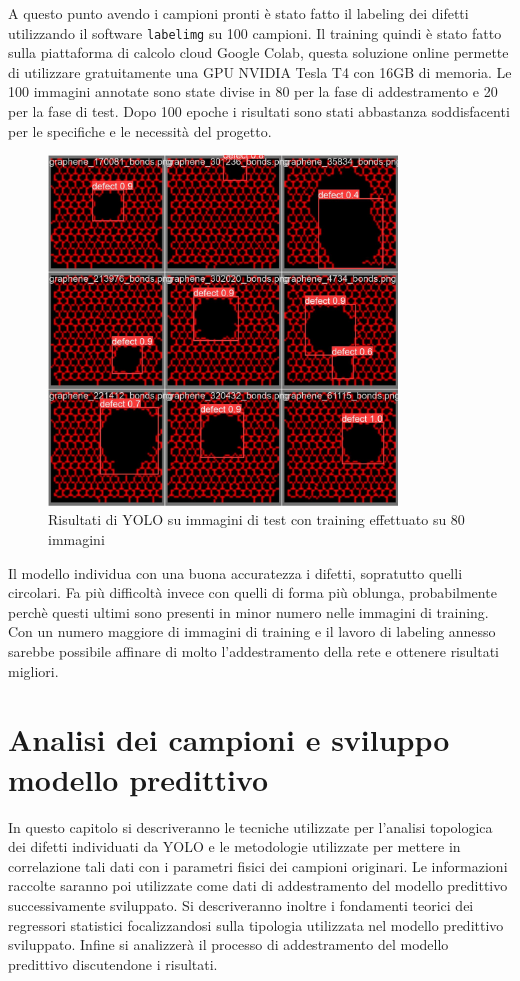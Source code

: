\documentclass[12pt,a4paper,openright,twoside]{report}
\begin{document}
A questo punto avendo i campioni pronti è stato fatto il labeling dei difetti utilizzando il software \texttt{labelimg} su 100 campioni. 
Il training quindi è stato fatto sulla piattaforma di calcolo cloud Google Colab, questa soluzione online permette di utilizzare gratuitamente una GPU NVIDIA Tesla T4 con 16GB di memoria.
Le 100 immagini annotate sono state divise in 80 per la fase di addestramento e 20 per la fase di test. 
Dopo 100 epoche i risultati sono stati abbastanza soddisfacenti per le specifiche e le necessità del progetto. 
\begin{figure}[h]
\centering
\includegraphics[width=350px,keepaspectratio]{outputYOLOreduced.jpg}
\caption{Risultati di YOLO su immagini di test con training effettuato su 80 immagini}
\end{figure}
\newpage
Il modello individua con una buona accuratezza i difetti, sopratutto quelli circolari. Fa più difficoltà invece con quelli di forma più oblunga, probabilmente perchè questi ultimi sono presenti in minor numero nelle immagini di training. 
Con un numero maggiore di immagini di training e il lavoro di labeling annesso sarebbe possibile affinare di molto l'addestramento della rete e ottenere risultati migliori. \\

{\let\clearpage\relax \chapter{Analisi dei campioni e sviluppo modello predittivo}}
In questo capitolo si descriveranno le tecniche utilizzate per l'analisi topologica dei difetti individuati da YOLO e le metodologie utilizzate per mettere in correlazione tali dati con i parametri fisici dei campioni originari.
Le informazioni raccolte saranno poi utilizzate come dati di addestramento del modello predittivo successivamente sviluppato. 
Si descriveranno inoltre i fondamenti teorici dei regressori statistici focalizzandosi sulla tipologia utilizzata nel modello predittivo sviluppato. 
Infine si analizzerà il processo di addestramento del modello predittivo discutendone i risultati.
\end{document}
